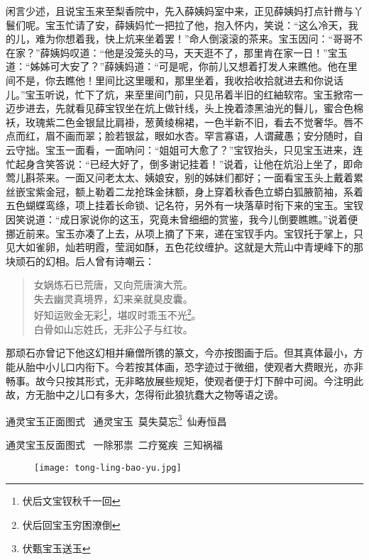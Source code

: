\documentclass[12pt,oneside]{book}
\newenvironment{shici}{%
\begin{verse}%
\centering\large\hspace{12pt}}%
{\end{verse}}
\begin{document}
闲言少述，且说宝玉来至梨香院中，先入薛姨妈室中来，正见薛姨妈打点针黹与丫鬟们呢。宝玉忙请了安，薛姨妈忙一把拉了他，抱入怀内，笑说：“这么冷天，我的儿，难为你想着我，快上炕来坐着罢！”命人倒滚滚的茶来。宝玉因问：“哥哥不在家？”薛姨妈叹道：“他是没笼头的马，天天逛不了，那里肯在家一日！”宝玉道：“姊姊可大安了？”薛姨妈道：“可是呢，你前儿又想着打发人来瞧他。他在里间不是，你去瞧他！里间比这里暖和，那里坐着，我收拾收拾就进去和你说话儿。”宝玉听说，忙下了炕，来至里间门前，只见吊着半旧的红紬软帘。宝玉掀帘一迈步进去，先就看见薛宝钗坐在炕上做针线，头上挽着漆黑油光的䰖儿，蜜合色棉袄，玫瑰紫二色金银鼠比肩褂，葱黄绫棉裙，一色半新不旧，看去不觉奢华。唇不点而红，眉不画而翠；脸若银盆，眼如水杏。罕言寡语，人谓藏愚；安分随时，自云守拙。宝玉一面看，一面吶问：“姐姐可大愈了？”宝钗抬头，只见宝玉进来，连忙起身含笑答说：“已经大好了，倒多谢记挂着！”说着，让他在炕沿上坐了，即命莺儿斟茶来。一面又问老太太、姨娘安，别的姊妹们都好；一面看宝玉头上戴着累丝嵌宝紫金冠，额上勒着二龙抢珠金抹额，身上穿着秋香色立蟒白狐腋箭袖，系着五色蝴蝶鸾绦，项上挂着长命锁、记名符，另外有一块落草时衔下来的宝玉。宝钗因笑说道：“成日家说你的这玉，究竟未曾细细的赏鉴，我今儿倒要瞧瞧。”说着便挪近前来。宝玉亦凑了上去，从项上摘了下来，递在宝钗手内。宝钗托于掌上，只见大如雀卵，灿若明霞，莹润如酥，五色花纹缠护。这就是大荒山中青埂峰下的那块顽石的幻相。后人曾有诗嘲云：

\begin{shici}
女娲炼石已荒唐，又向荒唐演大荒。\\
失去幽灵真境界，幻来亲就臭皮囊。\\
好知运败金无彩\footnote{伏后文宝钗秋千一回}，堪叹时乖玉不光\footnote{伏后回宝玉穷困潦倒}。\\
白骨如山忘姓氏，无非公子与红妆。
\end{shici}


那顽石亦曾记下他这幻相并癞僧所镌的篆文，今亦按图画于后。但其真体最小，方能从胎中小儿口内衔下。今若按其体画，恐字迹过于微细，使观者大费眼光，亦非畅事。故今只按其形式，无非略放展些规矩，使观者便于灯下醉中可阅。今注明此故，方无胎中之儿口有多大，怎得衔此狼犺蠢大之物等语之谤。

通灵宝玉正面图式  ~通灵宝玉~莫失莫忘\footnote{伏甄宝玉送玉}~仙寿恒昌

通灵宝玉反面图式  ~一除邪祟~二疗冤疾~三知祸福

 
\begin{figure}[H]
\centering
\texttt{[image: tong-ling-bao-yu.jpg]}
\end{figure} 
 
\end{document}
